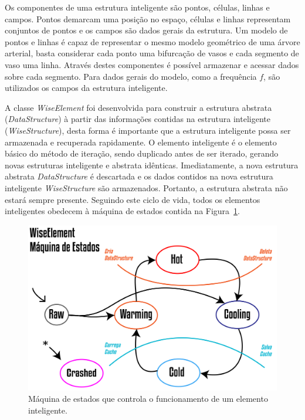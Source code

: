 Os componentes de uma estrutura inteligente são pontos, células, linhas e campos. Pontos demarcam uma posição no espaço, células e linhas representam conjuntos de pontos e os campos são dados gerais da estrutura. Um modelo de pontos e linhas é capaz de representar o mesmo modelo geométrico de uma árvore arterial, basta considerar cada ponto uma bifurcação de vasos e cada segmento de vaso uma linha. Através destes componentes é possível armazenar e acessar dados sobre cada segmento. Para dados gerais do modelo, como a frequência $f$, são utilizados os campos da estrutura inteligente.

A classe \textit{WiseElement} foi desenvolvida para construir a estrutura abstrata (\textit{DataStructure}) à partir das informações contidas na estrutura inteligente (\textit{WiseStructure}), desta forma é importante que a estrutura inteligente possa ser armazenada e recuperada rapidamente. O elemento inteligente é o elemento básico do método de iteração, sendo duplicado antes de ser iterado, gerando novas estruturas inteligente e abstrata idênticas. Imediatamente, a nova estrutura abstrata \textit{DataStructure} é descartada e os dados contidos na nova estrutura inteligente \textit{WiseStructure} são armazenados. Portanto, a estrutura abstrata não estará sempre presente. Seguindo este ciclo de vida, todos os elementos inteligentes obedecem à máquina de estados contida na Figura~\ref{fig3:wiselementstatus}.

\begin{figure}[!htbp]
	\centering
	\includegraphics[scale=1.5]{Figures/WiseElementStatus@16x.png}
	\caption{Máquina de estados que controla o funcionamento de um elemento inteligente.}
	\label{fig3:wiselementstatus}
\end{figure}


